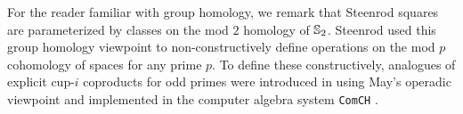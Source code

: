 \begin{remark}
	For the reader familiar with group homology, we remark that Steenrod squares are parameterized by classes on the mod $2$ homology of $\mathbb{S}_2$.
	Steenrod used this group homology viewpoint to non-constructively define operations on the mod $p$ cohomology of spaces \cite{steenrod1952reduced, steenrod1953cyclic, steenrod1962cohomology} for any prime $p$.
	To define these constructively, analogues of explicit cup-$i$ coproducts for odd primes were introduced in \cite{medina2021maysteenrod} using May's operadic viewpoint \cite{may1970general} and implemented in the computer algebra system \texttt{ComCH} \cite{medina2021computer}.
\end{remark}